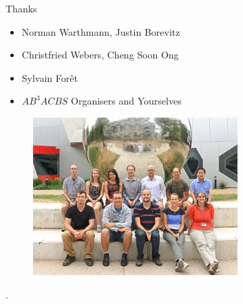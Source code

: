 \documentclass[t]{beamer}
\begin{document}
\begin{frame}{Thanks}
  \begin{itemize}
    \item Norman Warthmann, Justin Borevitz
    \item Christfried Webers, Cheng Soon Ong
    \item Sylvain For\^{e}t
    \item $AB^3ACBS$ Organisers and Yourselves
  \end{itemize}
  \begin{figure}
    \centering
    \includegraphics[width=0.7\textwidth]{img/lab.jpg}
  \end{figure}
\end{frame}

\begin{frame}[shrink=40]{}
  \printbibliography
  \vfill
  .
\end{frame}
\end{document}
